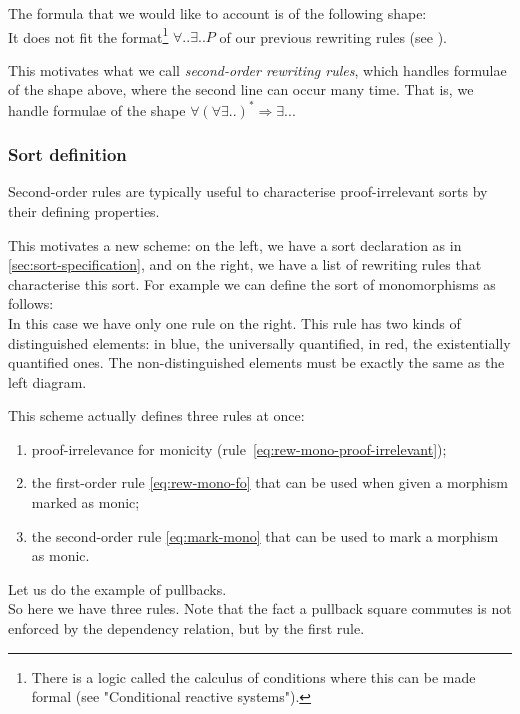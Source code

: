 \documentclass{article}
\begin{document}
The formula that we would like to account is of the following shape:
\[

\] 
It does not fit the format\footnote{There is a logic called the calculus of conditions where this can be made formal (see "Conditional reactive systems").} $∀ .. ∃ .. P$ of our previous rewriting rules (see ).

This motivates what we call \emph{second-order rewriting rules}, which handles formulae of the shape above, where 
the second line can occur many time. That is, we handle formulae of the shape $∀ (∀ ∃ .. )^* ⇒ ∃ .. $.
\subsubsection{Sort definition}
\label{sec:sort-definition}
Second-order rules are typically useful to characterise proof-irrelevant sorts by their defining properties.

This motivates a new scheme: on the left, we have a sort declaration as in \ref{sec:sort-specification}, and on the right, we have a list of rewriting rules that characterise this sort.
For example we can define the sort of monomorphisms as follows:
\[

\]
In this case we have only one rule on the right.
This rule has two kinds of distinguished elements: in blue, the universally quantified, in red, the existentially quantified ones. The non-distinguished elements must be exactly the same as the left diagram.

This scheme actually defines three rules at once: 
\begin{enumerate}
    \item proof-irrelevance for monicity (rule~\eqref{eq:rew-mono-proof-irrelevant});
    \item the first-order rule \eqref{eq:rew-mono-fo} that can be 
    used when given a morphism marked as monic;
    \item the second-order rule \eqref{eq:mark-mono} that can be used to mark a morphism as monic.
\end{enumerate}


Let us do the example of pullbacks.
\[

\]
So here we have three rules. Note that the fact a pullback square commutes is not enforced by the dependency relation, but by the first rule. 
\end{document}
